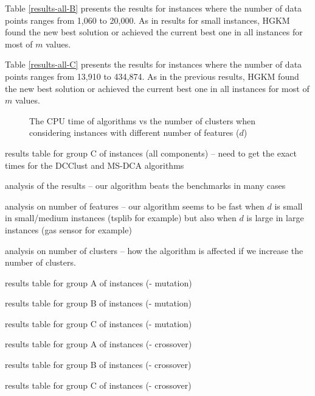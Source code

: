 Table \ref{results-all-B} presents the results for instances where the number of data points ranges from  1,060 to 20,000. As in results for small instances, HGKM found the new best solution or achieved the current best one in all instances for most of $m$ values.

Table \ref{results-all-C} presents the results for instances where the number of data points ranges from  13,910 to 434,874. As in the previous results, HGKM found the new best solution or achieved the current best one in all instances for most of $m$ values.


\begin{figure}[h!]
\centering
{}
\caption{The CPU time of algorithms vs the number of clusters when considering instances with different number of features ($d$)}
\end{figure}


\noindent [TO-DO] results table for group C of instances (all components) -- need to get the exact times for the DCClust and MS-DCA algorithms

\noindent [TO-DO] analysis of the results -- our algorithm beats the benchmarks in many cases

\noindent [TO-DO] analysis on number of features -- our algorithm seems to be fast when $d$ is small in small/medium instances (tsplib for example) but also when $d$ is large in large instances (gas sensor for example)

\noindent [TO-DO] analysis on number of clusters -- how the algorithm is affected if we increase the number of clusters.

\noindent [TO-DO] results table for group A of instances (- mutation)

\noindent [TO-DO] results table for group B of instances (- mutation)

\noindent [TO-DO] results table for group C of instances (- mutation)

\noindent [TO-DO] results table for group A of instances (- crossover)

\noindent [TO-DO] results table for group B of instances (- crossover)

\noindent [TO-DO] results table for group C of instances (- crossover)